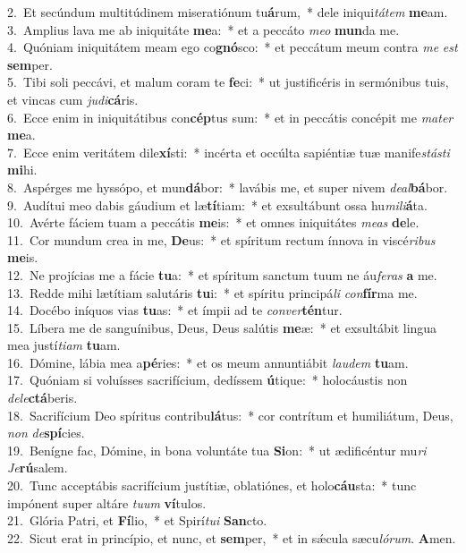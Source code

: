 {2.~}Et secúndum multitúdinem miseratiónum tu\textbf{á}rum,~* dele iniqui\textit{tá}\textit{tem} \textbf{me}am.\\
{3.~}Amplius lava me ab iniquitáte \textbf{me}a:~* et a peccáto \textit{me}\textit{o} \textbf{mun}da me.\\
{4.~}Quóniam iniquitátem meam ego co\textbf{gnó}sco:~* et peccátum meum contra \textit{me} \textit{est} \textbf{sem}per.\\
{5.~}Tibi soli peccávi, et malum coram te \textbf{fe}ci:~* ut justificéris in sermónibus tuis, et vincas cum \textit{ju}\textit{di}\textbf{cá}ris.\\
{6.~}Ecce enim in iniquitátibus con\textbf{cép}tus sum:~* et in peccátis concépit me \textit{ma}\textit{ter} \textbf{me}a.\\
{7.~}Ecce enim veritátem dile\textbf{xí}sti:~* incérta et occúlta sapiéntiæ tuæ manife\textit{stá}\textit{sti} \textbf{mi}hi.\\
{8.~}Aspérges me hyssópo, et mun\textbf{dá}bor:~* lavábis me, et super nivem \textit{de}\textit{al}\textbf{bá}bor.\\
{9.~}Audítui meo dabis gáudium et læ\textbf{tí}tiam:~* et exsultábunt ossa hu\textit{mi}\textit{li}\textbf{á}ta.\\
{10.~}Avérte fáciem tuam a peccátis \textbf{me}is:~* et omnes iniquitátes \textit{me}\textit{as} \textbf{de}le.\\
{11.~}Cor mundum crea in me, \textbf{De}us:~* et spíritum rectum ínnova in viscé\textit{ri}\textit{bus} \textbf{me}is.\\
{12.~}Ne projícias me a fácie \textbf{tu}a:~* et spíritum sanctum tuum ne áu\textit{fe}\textit{ras} \textbf{a} me.\\
{13.~}Redde mihi lætítiam salutáris \textbf{tu}i:~* et spíritu principá\textit{li} \textit{con}\textbf{fír}ma me.\\
{14.~}Docébo iníquos vias \textbf{tu}as:~* et ímpii ad te \textit{con}\textit{ver}\textbf{tén}tur.\\
{15.~}Líbera me de sanguínibus, Deus, Deus salútis \textbf{me}æ:~* et exsultábit lingua mea justí\textit{ti}\textit{am} \textbf{tu}am.\\
{16.~}Dómine, lábia mea a\textbf{pé}ries:~* et os meum annuntiábit \textit{lau}\textit{dem} \textbf{tu}am.\\
{17.~}Quóniam si voluísses sacrifícium, dedíssem \textbf{ú}tique:~* holocáustis non \textit{de}\textit{le}\textbf{ctá}beris.\\
{18.~}Sacrifícium Deo spíritus contribu\textbf{lá}tus:~* cor contrítum et humiliátum, Deus, \textit{non} \textit{de}\textbf{spí}cies.\\
{19.~}Benígne fac, Dómine, in bona voluntáte tua \textbf{Si}on:~* ut ædificéntur mu\textit{ri} \textit{Je}\textbf{rú}salem.\\
{20.~}Tunc acceptábis sacrifícium justítiæ, oblatiónes, et holo\textbf{cáu}sta:~* tunc impónent super altáre \textit{tu}\textit{um} \textbf{ví}tulos.\\
{21.~}Glória Patri, et \textbf{Fí}lio,~* et Spirí\textit{tu}\textit{i} \textbf{San}cto.\\
{22.~}Sicut erat in princípio, et nunc, et \textbf{sem}per,~* et in sǽcula sæcu\textit{ló}\textit{rum}. \textbf{A}men.\\
